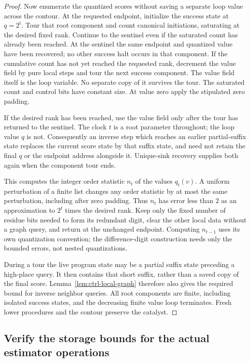 \documentclass[11pt]{article}
\numberwithin{equation}{section}
\theoremstyle{definition}
\theoremstyle{remark}
\begin{document}
\begin{proof}
Now enumerate the quantized scores without saving a separate loop value across the contour. At the requested endpoint, initialize the success state at $q=2^t$.
Tour that root component and count canonical
initiations, saturating at the desired fixed rank.  Continue to the
sentinel even if the saturated count has already been reached.  At the
sentinel the same endpoint and quantized value have been recovered; no
other success halt occurs in that component.  If the cumulative count
has not yet reached the requested rank, decrement the value field by
pure local steps and tour the next success component.  The value field
itself is the loop variable.  No separate copy of it survives the tour.
The saturated count and control bits have constant size.  At value zero
apply the stipulated zero padding.

If the desired rank has been reached, use the value field only after
the tour has returned to the sentinel.  The clock $t$ is a root
parameter throughout; the loop value $q$ is not.  Consequently an inverse
step which reaches an earlier partial-suffix state replaces the current
score state by that suffix state, and need not retain the final $q$ or
the endpoint address alongside it.  Unique-sink recovery supplies both
again when the component tour ends.

This computes the integer order statistic ${n}_t$ of the values $q_t(v)$.
A uniform
perturbation of a finite list changes any order statistic by at most
the same perturbation, including after zero padding.  Thus ${n}_t$ has
error less than $2$ as an approximation to $2^t$ times the desired rank.
Keep only the fixed number of residue bits needed to form its
redundant digit, clear the other local data without a graph query, and
return at the unchanged endpoint.  Computing ${n}_{t-1}$ uses its own
quantization convention; the difference-digit construction needs only
the bounded errors, not nested quantizations.

During a tour the live program state may be a partial suffix state
preceding a high-place query.  It then contains that short suffix,
rather than a saved copy of the final score.  Lemma~\ref{lem:ctrl-local-graph}
therefore also gives the required bound for inverse neighbor queries.
All root components are finite, including isolated success states, and
the decreasing finite value loop terminates.  Fresh lower procedures
and the contour preserve the catalyst.
\end{proof}

\subsection{Verify the storage bounds for the actual estimator operations}\label{sec:ctrl-recipes}
\end{document}
